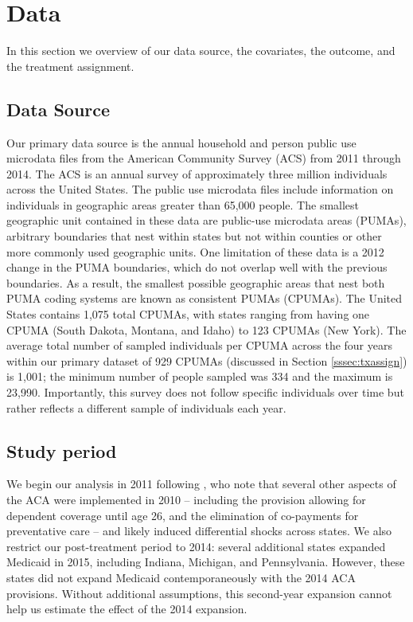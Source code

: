 \documentclass[aoas]{imsart}
\theoremstyle{plain}
\theoremstyle{remark}
\begin{document}
\section{Data}

In this section we overview of our data source, the covariates, the outcome, and the treatment assignment.

\subsection{Data Source}

Our primary data source is the annual household and person public use microdata files from the American Community Survey (ACS) from 2011 through 2014. The ACS is an annual survey of approximately three million individuals across the United States. The public use microdata files include information on individuals in geographic areas greater than 65,000 people. The smallest geographic unit contained in these data are public-use microdata areas (PUMAs), arbitrary boundaries that nest within states but not within counties or other more commonly used geographic units. One limitation of these data is a 2012 change in the PUMA boundaries, which do not overlap well with the previous boundaries. As a result, the smallest possible geographic areas that nest both PUMA coding systems are known as consistent PUMAs (CPUMAs). The United States contains 1,075 total CPUMAs, with states ranging from having one CPUMA (South Dakota, Montana, and Idaho) to 123 CPUMAs (New York). The average total number of sampled individuals per CPUMA across the four years within our primary dataset of 929 CPUMAs (discussed in Section \ref{sssec:txassign}) is 1,001; the minimum number of people sampled was 334 and the maximum is 23,990. Importantly, this survey does not follow specific individuals over time but rather reflects a different sample of individuals each year.

\subsection{Study period}

We begin our analysis in 2011 following \cite{courtemanche2017early}, who note that several other aspects of the ACA were implemented in 2010 -- including the provision allowing for dependent coverage until age 26, and the elimination of co-payments for preventative care -- and likely induced differential shocks across states. We also restrict our post-treatment period to 2014: several additional states expanded Medicaid in 2015, including Indiana, Michigan, and Pennsylvania. However, these states did not expand Medicaid contemporaneously with the 2014 ACA provisions. Without additional assumptions, this second-year expansion cannot help us estimate the effect of the 2014 expansion. 
\end{document}
